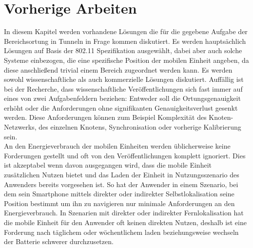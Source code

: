 
\chapter{Vorherige Arbeiten}
\label{ch:Vorherige}
In diesem Kapitel werden vorhandene Lösungen die für die gegebene Aufgabe der Bereichsortung in Tunneln in Frage kommen diskutiert. 
Es werden hauptsächlich Lösungen auf Basis der 802.11 Spezifikation ausgewählt, dabei aber auch solche Systeme einbezogen, die eine spezifische Position der mobilen Einheit angeben, da diese anschließend trivial einem Bereich zugeordnet werden kann. 
Es werden sowohl wissenschaftliche als auch kommerzielle Lösungen diskutiert.
Auffällig ist bei der Recherche, dass wissenschaftliche Veröffentlichungen sich fast immer auf eines von zwei Aufgabenfeldern beziehen: Entweder soll die Ortungsgenauigkeit erhöht oder die Anforderungen ohne signifikanten Genauigkeitsverlust gesenkt werden. 
Diese Anforderungen können zum Beispiel Komplexität des Knoten-Netzwerks, des einzelnen Knotens, Synchronisation oder vorherige Kalibrierung sein.\\
An den Energieverbrauch der mobilen Einheiten werden üblicherweise keine Forderungen gestellt und oft von den Veröffentlichungen komplett ignoriert.
Dies ist akzeptabel wenn davon ausgegangen wird, dass die mobile Einheit zusätzlichen Nutzen bietet und das Laden der Einheit in Nutzungsszenario des Anwenders bereits vorgesehen ist.
So hat der Anwender in einem Szenario, bei dem sein Smartphone mittels direkter oder indirekter Selbstlokalisation seine Position bestimmt um ihn zu navigieren nur minimale Anforderungen an den Energieverbrauch.
In Szenarien mit direkter oder indirekter Fernlokalisation hat die mobile Einheit für den Anwender oft keinen direkten Nutzen, deshalb ist eine Forderung nach täglichem oder wöchentlichem laden beziehungsweise wechseln der Batterie schwerer durchzusetzen.\\


